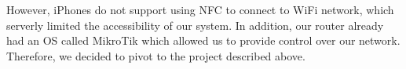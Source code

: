 \documentclass[sigconf]{acmart}
\begin{document}
However, iPhones do not support using NFC to connect to WiFi network, which serverly limited the accessibility of our system. In addition, our router already had an OS called MikroTik which allowed us to provide control over our network. Therefore, we decided to pivot to the project described above.




 
\end{document}
